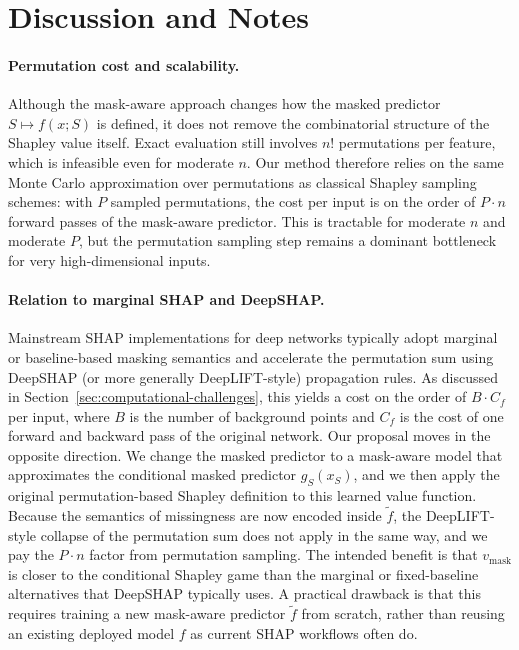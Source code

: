 \documentclass{article}
\begin{document}
\section{Discussion and Notes}
\label{sec:discussion}

\paragraph{Permutation cost and scalability.}
Although the mask-aware approach changes how the masked predictor $S \mapsto f(x; S)$ is defined, it does not remove the combinatorial structure of the Shapley value itself.
Exact evaluation still involves $n!$ permutations per feature, which is infeasible even for moderate $n$.
Our method therefore relies on the same Monte Carlo approximation over permutations as classical Shapley sampling schemes: with $P$ sampled permutations, the cost per input is on the order of $P \cdot n$ forward passes of the mask-aware predictor.
This is tractable for moderate $n$ and moderate $P$, but the permutation sampling step remains a dominant bottleneck for very high-dimensional inputs.

\paragraph{Relation to marginal SHAP and DeepSHAP.}
Mainstream SHAP implementations for deep networks typically adopt marginal or baseline-based masking semantics and accelerate the permutation sum using DeepSHAP (or more generally DeepLIFT-style) propagation rules.
As discussed in Section~\ref{sec:computational-challenges}, this yields a cost on the order of $B \cdot C_f$ per input, where $B$ is the number of background points and $C_f$ is the cost of one forward and backward pass of the original network.
Our proposal moves in the opposite direction.
We change the masked predictor to a mask-aware model that approximates the conditional masked predictor $g_S(x_S)$, and we then apply the original permutation-based Shapley definition to this learned value function.
Because the semantics of missingness are now encoded inside $\tilde f$, the DeepLIFT-style collapse of the permutation sum does not apply in the same way, and we pay the $P \cdot n$ factor from permutation sampling.
The intended benefit is that $v_{\text{mask}}$ is closer to the conditional Shapley game than the marginal or fixed-baseline alternatives that DeepSHAP typically uses.
A practical drawback is that this requires training a new mask-aware predictor $\tilde f$ from scratch, rather than reusing an existing deployed model $f$ as current SHAP workflows often do.
\end{document}
